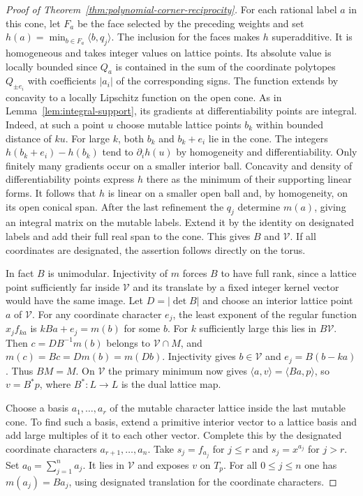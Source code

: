 \documentclass[11pt,reqno]{amsart}
\numberwithin{equation}{section}
\theoremstyle{definition}
\theoremstyle{remark}
\begin{document}
\begin{proof}[Proof of Theorem~\ref{thm:polynomial-corner-reciprocity}]
For each rational label \(a\) in this cone, let \(F_a\) be the face
selected by the preceding weights and set
\(h(a)=\min_{b\in F_a}\langle b,q_j\rangle\).
The inclusion for the faces makes \(h\) superadditive. It is
homogeneous and takes integer values on lattice points. Its
absolute value is locally bounded since \(Q_a\) is contained in the
sum of the coordinate polytopes \(Q_{\pm e_i}\) with coefficients
\(|a_i|\) of the corresponding signs. The function extends by
concavity to a locally Lipschitz function on the open cone.
As in Lemma~\ref{lem:integral-support}, its gradients at
differentiability points are integral. Indeed, at such a point \(u\)
choose mutable lattice points \(b_k\) within bounded distance of
\(ku\). For large \(k\), both \(b_k\) and \(b_k+e_i\) lie in the cone. The integers
\(h(b_k+e_i)-h(b_k)\) tend to \(\partial_i h(u)\) by homogeneity
and differentiability. Only finitely many gradients occur on a
smaller interior ball. Concavity and density of differentiability
points express \(h\) there as the minimum of their supporting
linear forms. It follows that \(h\) is linear on a smaller open ball
and, by homogeneity, on its open conical span.
After the last refinement the \(q_j\) determine \(m(a)\), giving
an integral matrix on the mutable labels. Extend it by the identity
on designated labels and add their full real span to the cone.
This gives \(B\) and \(\mathcal V\). If all coordinates are designated,
the assertion follows directly on the torus.

In fact \(B\) is unimodular. Injectivity of \(m\) forces \(B\) to
have full rank, since a lattice point sufficiently far inside
\(\mathcal V\) and its translate by a fixed integer kernel vector
would have the same image. Let \(D=|\det B|\) and choose an interior
lattice point \(a\) of \(\mathcal V\). For any coordinate character
\(e_j\), the least exponent of the regular function \(x_j f_{ka}\)
is \(kBa+e_j=m(b)\) for some \(b\). For \(k\) sufficiently large
this lies in \(B\mathcal V\). Then \(c=DB^{-1}m(b)\) belongs to
\(\mathcal V\cap M\), and \(m(c)=Bc=Dm(b)=m(Db)\).
Injectivity gives \(b\in\mathcal V\) and \(e_j=B(b-ka)\).
Thus \(BM=M\). On \(\mathcal V\) the primary minimum now gives
\(\langle a,v\rangle=\langle Ba,p\rangle\), so \(v=B^*p\), where
\(B^*:L\to L\) is the dual lattice map.

Choose a basis \(a_1,\ldots,a_r\) of the mutable character lattice
inside the last mutable cone. To find such a basis, extend a
primitive interior vector to a lattice basis and add large multiples
of it to each other vector. Complete this by the designated coordinate
characters \(a_{r+1},\ldots,a_n\). Take \(s_j=f_{a_j}\) for \(j\le r\)
and \(s_j=x^{a_j}\) for \(j>r\). Set \(a_0=\sum_{j=1}^n a_j\).
It lies in \(\mathcal V\) and exposes \(v\) on \(T_p\). For all
\(0\le j\le n\) one has \(m(a_j)=Ba_j\), using designated translation
for the coordinate characters.


\end{proof}
\end{document}
